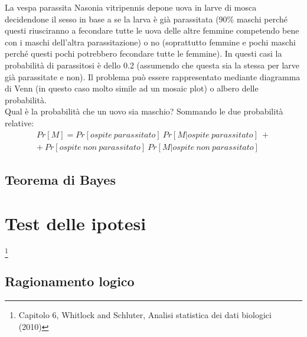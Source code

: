 \documentclass[drafts, 10pt]{book}
\newcounter{example}[section]
\begin{document}
\begin{example}
    La vespa parassita Nasonia vitripennis depone uova in larve di mosca decidendone il sesso in base a se la larva è già parassitata (90\% maschi perché questi riusciranno a fecondare tutte le uova delle altre femmine competendo bene con i maschi dell’altra parassitazione) o no (soprattutto femmine e pochi maschi perché questi pochi potrebbero fecondare tutte le femmine). In questi casi la probabilità di parassitosi è dello 0.2 (assumendo che questa sia la stessa per larve già parassitate e non). Il problema può essere rappresentato mediante diagramma di Venn (in questo caso molto simile ad un mosaic plot) o albero delle probabilità. 
    \\
    Qual è la probabilità che un uovo sia maschio? Sommando le due probabilità relative:
    \begin{equation}
        \begin{gathered}
            Pr[M]=Pr[ospite\ parassitato]\ Pr[M|ospite\ parassitato]\ + \\ +\ Pr[ospite\ non\ parassitato]\ Pr[M|ospite\ non\ parassitato]
        \end{gathered}
    \end{equation}
\end{example}
 
\section{Teorema di Bayes}


\chapter{Test delle ipotesi}\footnote{Capitolo 6, Whitlock and Schluter, Analisi statistica dei dati biologici (2010)}

\section{Ragionamento logico}
\end{document}

